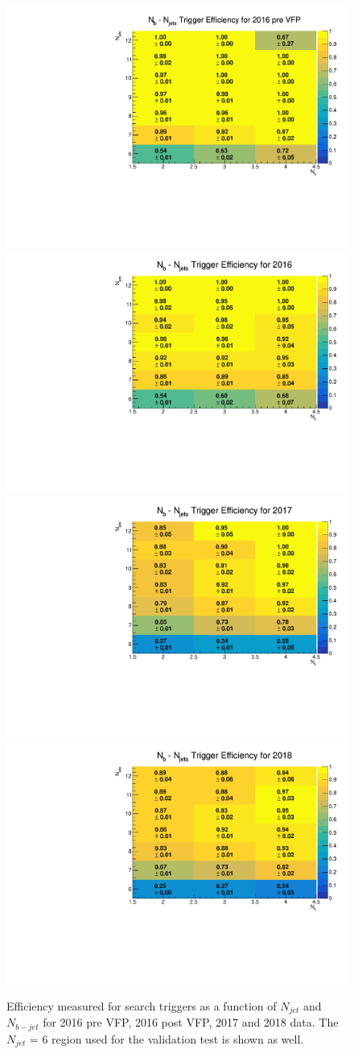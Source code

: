 \documentclass[twoside]{article}
\begin{document}
\begin{figure}[!t]
    \centering
    \includegraphics[width=.4\columnwidth]{plots/Trigger/2016_preVFP.pdf}
    \includegraphics[width=.4\columnwidth]{plots/Trigger/2016.pdf}
    \includegraphics[width=.4\columnwidth]{plots/Trigger/2017.pdf}
    \includegraphics[width=.4\columnwidth]{plots/Trigger/2018.pdf}
    
    \caption{Efficiency measured for search triggers as a function of $N_{jet}$ and $N_{b-jet}$ for 2016 pre VFP, 2016 post VFP, 2017 and 2018 data. The $N_{jet}$ = 6 region used for the validation test is shown as well.}
\end{figure}
\end{document}
